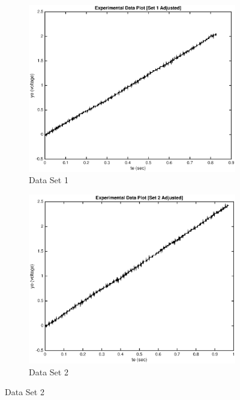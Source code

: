 \documentclass[11pt,a4paper]{article}
\begin{document}
\begin{enumerate}
\begin{figure}[H]
  \begin{subfigure}{0.5\textwidth}
  \includegraphics[width=0.9\linewidth]{Matlab_Figures/B2_dataset1.eps} 
  \caption{Data Set 1}
  \label{fig:subim1}
  \end{subfigure}
  \begin{subfigure}{0.5\textwidth}
  \includegraphics[width=0.9\linewidth]{Matlab_Figures/B2_dataset2.eps}
  \caption{Data Set 2}
  \label{fig:subim2}
  \end{subfigure}
  

\end{figure}
\end{enumerate}
\end{document}
